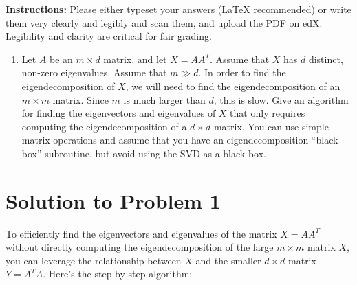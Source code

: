 \documentclass{article}
\begin{document}
\begin{center}
\end{center}

\vspace{1cm}

\textbf{Instructions:} Please either typeset your answers ({\LaTeX} recommended) or write them very clearly and legibly and scan them, and upload the PDF on edX. Legibility and clarity are critical for fair grading.

\begin{enumerate}
    \item Let $A$ be an $m \times d$ matrix, and let $X = AA^T$. Assume that $X$ has $d$ distinct, non-zero eigenvalues. Assume that $m \gg d$. In order to find the eigendecomposition of $X$, we will need to find the eigendecomposition of an $m \times m$ matrix. Since $m$ is much larger than $d$, this is slow. Give an algorithm for finding the eigenvectors and eigenvalues of $X$ that only requires computing the eigendecomposition of a $d \times d$ matrix. You can use simple matrix operations and assume that you have an eigendecomposition ``black box'' subroutine, but avoid using the SVD as a black box.
\end{enumerate}

\section*{Solution to Problem 1}

To efficiently find the eigenvectors and eigenvalues of the matrix $X = AA^T$ without directly computing the eigendecomposition of the large $m \times m$ matrix $X$, you can leverage the relationship between $X$ and the smaller $d \times d$ matrix $Y = A^T A$. Here's the step-by-step algorithm:
\end{document}

